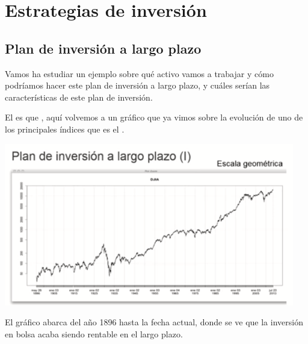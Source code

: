 \chapter{Estrategias de inversión}

\section{Plan de inversión a largo plazo}

Vamos ha estudiar un ejemplo sobre qué activo vamos a trabajar y cómo podríamos hacer este plan de inversión a largo plazo, y cuáles serían las características de este plan de inversión.

El  es que , aquí volvemos a un gráfico que ya vimos sobre la evolución de uno de los principales índices que es el .

\begin{center}
    \includegraphics[scale=.85]{images/mod03-01.png}
\end{center}

El gráfico abarca del año 1896 hasta la fecha actual, donde se ve que la inversión en bolsa acaba siendo rentable en el largo plazo.

